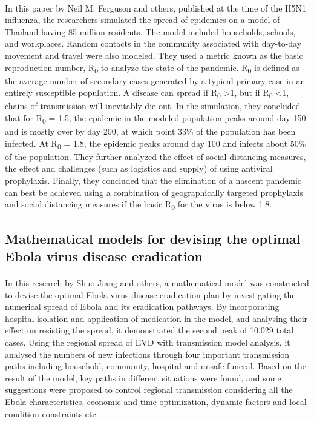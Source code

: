 \documentclass[14pt, a4paper]{extarticle}
\begin{document}
	       \paragraph{} In this paper by Neil M. Ferguson and others, published at the time of the H5N1 influenza, the researchers simulated the spread of epidemics on a model of Thailand having 85 million residents. The model included households, schools, and workplaces. Random contacts in the community associated with day-to-day movement and travel were also modeled. They used a metric known as the basic reproduction number, R\textsubscript{0} to analyze the state of the pandemic. R\textsubscript{0} is defined as the average number of secondary cases generated by a typical primary case in an entirely susceptible population. A disease can spread if R\textsubscript{0} \textgreater 1, but if R\textsubscript{0} \textless 1, chains of transmission will inevitably die out. In the simulation, they concluded that for R\textsubscript{0} = 1.5, the epidemic in the modeled population peaks around day 150 and is mostly over by day 200, at which point 33\% of the population has been infected. At R\textsubscript{0} = 1.8, the epidemic peaks around day 100 and infects about 50\% of the population. They further analyzed the effect of social distancing measures, the effect and challenges (such as logistics and supply) of using antiviral prophylaxis. Finally, they concluded that the elimination of a nascent pandemic can best be achieved using a combination of geographically targeted prophylaxis and social distancing measures if the basic R\textsubscript{0} for the virus is below 1.8.
	       
	   \subsection{Mathematical models for devising the optimal Ebola virus disease eradication}
	       \paragraph{} In this research by Shuo Jiang and others, a mathematical model was constructed to devise the optimal Ebola virus disease eradication plan by investigating the numerical spread of Ebola and its eradication pathways. By incorporating hospital isolation and application of medication in the model, and analysing their effect on resisting the spread, it demonstrated the second peak of 10,029 total cases. Using the regional spread of EVD with transmission model analysis, it analysed the numbers of new infections through four important transmission paths including household, community, hospital and unsafe funeral. Based on the result of the model, key paths in different situations were found, and some suggestions were proposed to control regional transmission considering all the Ebola characteristics, economic and time optimization, dynamic factors and local condition constraints etc.
	
\end{document}
